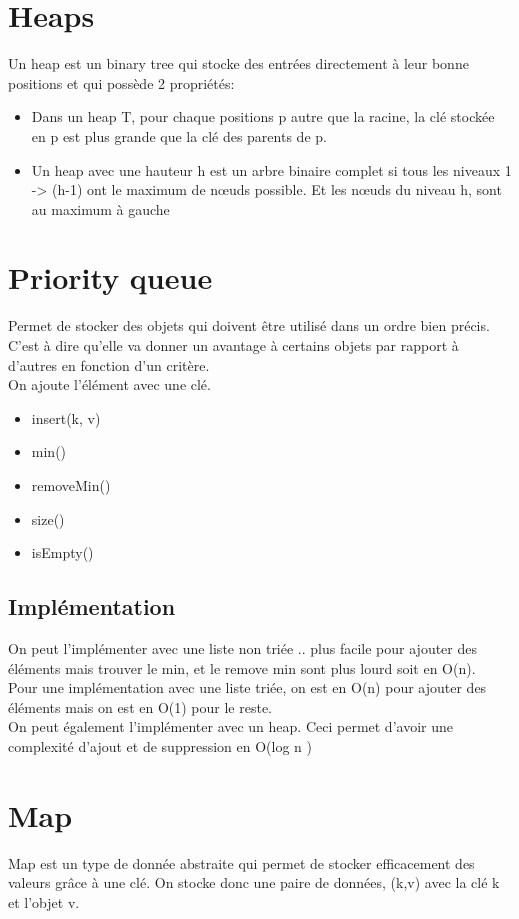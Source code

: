 \documentclass[a4paper]{article}
\begin{document}
\section{Heaps}
Un heap est un binary tree qui stocke des entrées directement à leur bonne positions et qui possède 2 propriétés:
\begin{itemize}
\item Dans un heap T, pour chaque positions p autre que la racine, la clé stockée en p est plus grande que la clé des parents de p.
\item Un heap avec une hauteur h est un arbre binaire complet si tous les niveaux  1 -> (h-1) ont le maximum de nœuds possible. Et les nœuds du niveau h, sont au maximum à gauche
\end{itemize}

\section{Priority queue}
Permet de stocker des objets qui doivent être utilisé dans un ordre bien précis. C'est à dire qu'elle va donner un avantage à certains objets par rapport à d'autres en fonction d'un critère.\\
On ajoute l'élément avec une clé.\\

\begin{itemize}
\item insert(k, v)
\item min()
\item removeMin()
\item size()
\item isEmpty()
\end{itemize}

\subsection{Implémentation}
On peut l'implémenter avec une liste non triée .. plus facile pour ajouter des éléments mais trouver le min, et le remove min sont plus lourd soit en O(n).\\

Pour une implémentation avec une liste triée, on est en O(n) pour ajouter des éléments mais on est en O(1) pour le reste.\\

On peut également l'implémenter avec un heap. Ceci permet d'avoir une complexité d'ajout et de suppression en O(log n )

\section{Map}
Map est un type de donnée abstraite qui permet de stocker efficacement des valeurs grâce à une clé. On stocke donc une paire de données, (k,v) avec la clé k et l'objet v.
\end{document}

